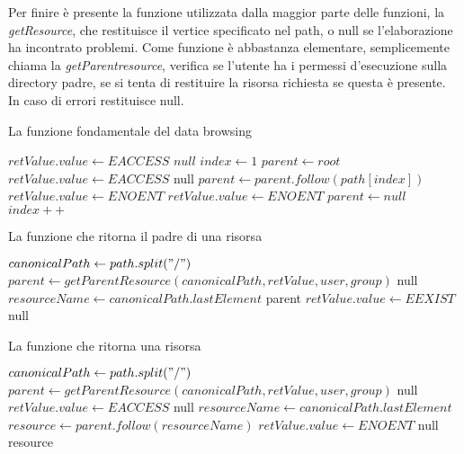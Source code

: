 Per finire è presente la funzione utilizzata dalla maggior parte delle funzioni, la \emph{getResource}, che restituisce il vertice specificato nel path, o null se l'elaborazione ha incontrato problemi. Come funzione è abbastanza elementare, semplicemente chiama la \emph{getParentresource}, verifica se l'utente ha i permessi d'esecuzione sulla directory padre, se si tenta di restituire la risorsa richiesta se questa è presente. In caso di errori restituisce null.

\begin{algorithm}
\caption{La funzione fondamentale del data browsing}
\begin{algorithmic}[5]
		\State $retValue.value \gets EACCESS$
		\State \Return $null$
	\EndIf
	\State $index \gets 1$
	\State $parent \gets root$
			\State $retValue.value \gets EACCESS$
			\State \Return null
		\EndIf
		\State $parent \gets parent.follow(path[index])$
			\State $retValue.value \gets ENOENT$
			\State $retValue.value \gets ENOENT$
			\State $parent \gets null$
		\EndIf
		\State $index++$
	\EndWhile
\EndFunction
\end{algorithmic}
\end{algorithm}
\begin{algorithm}
\caption{La funzione che ritorna il padre di una risorsa}
\begin{algorithmic}[5]
	\State $canonicalPath \gets path.split("/")$
	\State $parent \gets getParentResource(canonicalPath, retValue, user, group)$
		\State \Return null
	\EndIf
	\State $resourceName \gets canonicalPath.lastElement$
		\State \Return parent
	\EndIf
	\State $retValue.value \gets EEXIST$
	\State \Return null
\EndFunction
\end{algorithmic}
\end{algorithm}
\begin{algorithm}
\begin{algorithmic}[5]
\caption{La funzione che ritorna una risorsa}
	\State $canonicalPath \gets path.split("/")$
	\State $parent \gets getParentResource(canonicalPath, retValue, user, group)$
		\State \Return null
	\EndIf
	\State $retValue.value \gets EACCESS$
		\State \Return null
	\EndIf
	\State $resourceName \gets canonicalPath.lastElement$
	\State $resource \gets parent.follow(resourceName)$
		\State $retValue.value \gets ENOENT$
		\State \Return null
	\EndIf
	\State \Return resource
\EndFunction
\end{algorithmic}
\end{algorithm}

